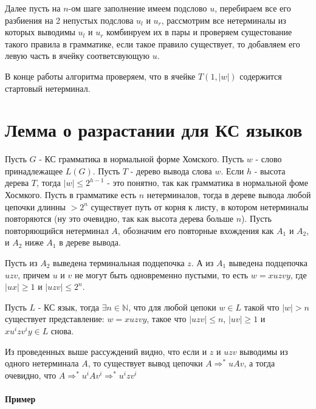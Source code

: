 Далее пусть на $n$-ом шаге заполнение имеем подслово $u$, перебираем все его разбиения на 2 непустых подслова $u_l$ и $u_r$, рассмотрим все нетерминалы
из которых выводимы $u_l$ и $u_r$ комбинруем их в пары и проверяем сущестование такого правила в грамматике, если такое правило существует, то добавляем
его левую часть в ячейку соответсвующую $u$.

В конце работы алгоритма проверяем, что в ячейке $T(1,|w|)$ содержится стартовый нетерминал.

\section{Лемма о разрастании для КС языков}

Пусть $G$ - КС грамматика в нормальной форме Хомского. Пусть $w$ - слово принадлежащее $L(G)$. Пусть $T$ - дерево вывода слова $w$. Если $h$ - высота дерева
$T$, тогда $|w| \le 2^{h-1}$ - это понятно, так как грамматика в нормальной фоме Хосмкого. Пусть в грамматике есть $n$ нетерминалов, тогда в дереве вывода
любой цепочки длинны $> 2^n$ существует путь от корня к листу, в котором нетерминалы повторяются (ну это очевидно, так как высота дерева больше $n$). Пусть
повторяющийся нетерминал $A$, обозначим его повторные вхождения как $A_1$ и $A_2$, и $A_2$ ниже $A_1$ в дереве вывода.

Пусть из $A_2$ выведена терминальная подцепочка $z$. А из $A_1$ выведена подцепочка $uzv$, причем $u$ и $v$ не могут быть одновременно пустыми, то есть
$w = x uzv y$, где $|ux| \ge 1$ и $|uzv| \le 2^n$.

\begin{Lemm}[о разрастании]
Пусть $L$ - КС язык, тогда $\exists n \in \mathbb{N}$, что для любой цепоки $w \in L$ такой что $|w| > n$ существует представление:
$w = xuzvy$, такое что $|uzv| \le n$, $|uv| \ge 1$ и $xu^izv^iy \in L$ снова.
\end{Lemm}

\begin{Proof}
Из проведенных выше рассуждений видно, что если и $z$ и $uzv$ выводимы из одного нетерминала $A$, то существует вывод цепочки $A \Rightarrow^{*} uAv$, а
тогда очевидно, что $A \Rightarrow^{*} u^iAv^i \Rightarrow^{*} u^izv^i$
\end{Proof}

\paragraph{Пример}


